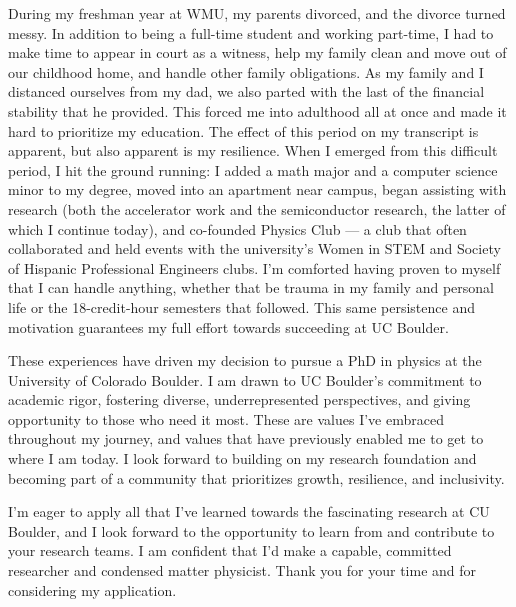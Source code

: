 \documentclass[11pt]{article}
\newcommand{\schoolabbr}{CU Boulder}
\begin{document}
During my freshman year at WMU, my parents divorced, and the divorce turned messy. In addition to being a full-time student and working part-time, I had to make time to appear in court as a witness, help my family clean and move out of our childhood home, and handle other family obligations. As my family and I distanced ourselves from my dad, we also parted with the last of the financial stability that he provided. This forced me into adulthood all at once and made it hard to prioritize my education. The effect of this period on my transcript is apparent, but also apparent is my resilience. When I emerged from this difficult period, I hit the ground running: I added a math major and a computer science minor to my degree, moved into an apartment near campus, began assisting with research (both the accelerator work and the semiconductor research, the latter of which I continue today), and co-founded Physics Club --- a club that often collaborated and held events with the university's Women in STEM and Society of Hispanic Professional Engineers clubs. I'm comforted having proven to myself that I can handle anything, whether that be trauma in my family and personal life or the 18-credit-hour semesters that followed. This same persistence and motivation guarantees my full effort towards succeeding at UC Boulder.

These experiences have driven my decision to pursue a PhD in physics at the University of Colorado Boulder. I am drawn to UC Boulder's commitment to academic rigor, fostering diverse, underrepresented perspectives, and giving opportunity to those who need it most. These are values I've embraced throughout my journey, and values that have previously enabled me to get to where I am today. I look forward to building on my research foundation and becoming part of a community that prioritizes growth, resilience, and inclusivity.

I'm eager to apply all that I've learned towards the fascinating research at \schoolabbr{}, and I look forward to the opportunity to learn from and contribute to your research teams. I am confident that I'd make a capable, committed researcher and condensed matter physicist. Thank you for your time and for considering my application.
\end{document}
